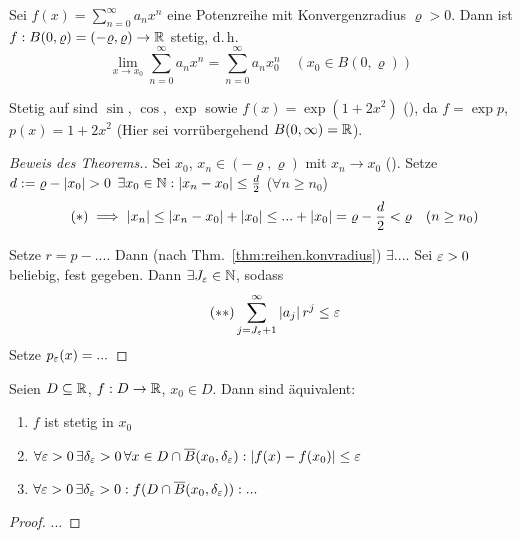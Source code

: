 \documentclass[12pt]{scrreprt}
\begin{document}
\begin{thm}\label{thm:fnkt.stetigk-potreihe}
Sei $f(x) = \sum_{n=0}^\infty a_nx^n$ eine Potenzreihe mit Konvergenzradius $\varrho > 0$. Dann ist $f: B(0, \varrho) = (-\varrho, \varrho)\rightarrow\mathbb{R}$
stetig, d.\,h. \[\lim_{x\to x_0} \sum_{n=0}^\infty a_nx^n = \sum_{n=0}^\infty a_nx_0^n\quad (x_0\in B(0, \varrho))\]
\end{thm}
\begin{bsp*}
Stetig auf  sind $\sin$, $\cos$, $\exp$ sowie $f(x) = \exp(1+2x^2)$ (),
da $f=\exp p$, $p(x) = 1+2x^2$ (Hier sei vorrübergehend $B(0, \infty) = \mathbb{R}$).
\end{bsp*}
\begin{proof}[Beweis des Theorems.]
Sei $x_0$, $x_n \in (-\varrho, \varrho)$ mit $x_n\to x_0$ (\ninf). Setze $d:= \varrho-\left\lvert x_0\right\lvert > 0$
\folgt $\exists x_0\in\mathbb{N}: \left\lvert x_n-x_0\right\lvert \le \frac{d}{2}$ ($\forall n\ge n_0$)
\begin{equation}\label{...}\tag{$*$}
\implies \left\lvert x_n\right\lvert \le \left\lvert x_n - x_0\right\lvert + \left\lvert x_0\right\lvert \le ... + \left\lvert x_0\right\lvert = \varrho - \frac{d}{2} < \varrho\quad (n\ge n_0)
\end{equation}

Setze $r=p - ...$. Dann (nach Thm.~\ref{thm:reihen.konvradius}) $\exists...$. Sei $\varepsilon >0$ beliebig, fest gegeben.
Dann $\exists J_\varepsilon\in\mathbb{N}$, sodass 
\begin{equation}\label{...}\tag{$**$}
\sum_{j=J_\varepsilon + 1}^\infty \left\lvert a_j\right\lvert r^j \le \varepsilon
\end{equation}
\noindent Setze $p_\varepsilon(x) = ...$
\end{proof}

\begin{satz}\label{satz:fnkt.stetigk-aequiv}
Seien $D\subseteq\mathbb{R}$, $f:D\rightarrow\mathbb{R}$, $x_0\in D$. Dann sind äquivalent:
\begin{enumerate}
\item $f$ ist stetig in $x_0$\label{satz:fnkt.stetigk-aequiv.a}
\item $\forall\varepsilon>0\,\exists\delta_\varepsilon > 0\,\forall x\in D\cap\overline{B}(x_0, \delta_\varepsilon): \left\lvert f(x) - f(x_0)\right\lvert \le \varepsilon$\label{satz:fnkt.stetigk-aequiv.b}
\item $\forall\varepsilon>0\,\exists\delta_\varepsilon > 0: f(D\cap\overline{B}(x_0, \delta_\varepsilon)): ...$\label{satz:fnkt.stetigk-aequiv.c}
\end{enumerate}
\end{satz}
\begin{proof}
...
\end{proof}
\end{document}
